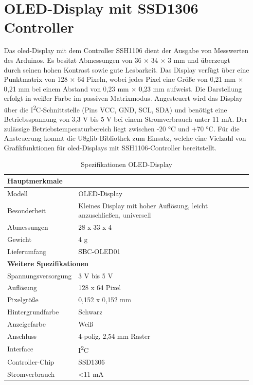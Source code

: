 \section{OLED-Display mit SSD1306 Controller}
Das \ac{oled}-Display mit dem Controller SSH1106 dient der Ausgabe von Messwerten des Arduinos. Es besitzt Abmessungen von 36 × 34 × 3 mm und überzeugt durch seinen hohen Kontrast sowie gute Lesbarkeit. Das Display verfügt über eine Punktmatrix von 128 × 64 Pixeln, wobei jedes Pixel eine Größe von 0,21 mm × 0,21 mm bei einem Abstand von 0,23 mm × 0,23 mm aufweist. Die Darstellung erfolgt in weißer Farbe im passiven Matrixmodus. Angesteuert wird das Display über die I\textsuperscript{2}C-Schnittstelle (Pins VCC, GND, SCL, SDA) und benötigt eine Betriebsspannung von 3,3 V bis 5 V bei einem Stromverbrauch unter 11 mA. Der zulässige Betriebstemperaturbereich liegt zwischen -20 °C und +70 °C. Für die Ansteuerung kommt die U8glib-Bibliothek zum Einsatz, welche eine Vielzahl von Grafikfunktionen für \ac{oled}-Displays mit SSH1106-Controller bereitstellt.\cite{Schreiter.2019}

\begin{longtable}[h]{|p{5cm}|p{8cm}|}
	\caption{Spezifikationen OLED-Display}
	\label{tab:specs_oled}\\
	\hline
	
	\multicolumn{2}{|l|}{\rule{0pt}{15pt}\textbf{Hauptmerkmale}} \\ \hline
	Modell & OLED-Display \\ \hline
	Besonderheit & Kleines Display mit hoher Auflösung, leicht anzuschließen, universell \\ \hline
	Abmessungen & 28 x 33 x 4 \\ \hline
	Gewicht & 4 g \\ \hline
	Lieferumfang & SBC-OLED01 \\ \hline
	
	\multicolumn{2}{|l|}{\rule{0pt}{15pt}\textbf{Weitere Spezifikationen}} \\ \hline
	Spannungsversorgung & 3 V bis 5 V \\ \hline
	Auflösung & 128 x 64 Pixel \\ \hline
	Pixelgröße & 0{,}152 x 0{,}152 mm \\ \hline
	Hintergrundfarbe & Schwarz \\ \hline
	Anzeigefarbe & Weiß \\ \hline
	Anschluss & 4-polig, 2{,}54 mm Raster \\ \hline
	Interface & I\textsuperscript{2}C \\ \hline
	Controller-Chip & SSD1306 \\ \hline
	Stromverbrauch & {<}11 mA \\ \hline
	
\end{longtable}


